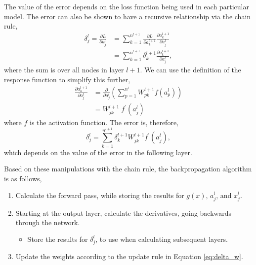 The value of the error depends on the loss function being used in each 
particular model. The error can also be shown to have a recursive relationship 
via the chain rule,
\begin{align*}
		\delta^l_j = \frac{\partial L}{\partial a^l_j} &= \sum_{k=1}^{n^{l+1}} 
		\frac{\partial L}{\partial a^{l+1}_{k}}\frac{\partial a^{l+1}_k}{\partial 
		a^l_j}\\ 
		&= \sum^{n^{l+1}}_{k = 1} \delta^{l+1}_k \frac{\partial a^{l+1}_k}{\partial 
		a^l_j},
\end{align*}
where the sum is over all nodes in layer $l+1$. We can use the definition of the
response function to simplify this further,
\begin{align*}
		\frac{\partial a^{l+1}_k}{\partial a^l_j} &= \frac{\partial}{\partial a^l_j} 
		\left( \sum^{n^l}_{p=1} W^{l+1}_{pk} f(a^l_p) \right) \\ 
		&= W^{l+1}_{jk} \; f^\prime(a^l_j)
\end{align*}
where $f$ is the activation function. The error is, therefore,
\begin{equation*}
	\delta^l_j = \sum^{n^{l+1}}_{k=1} \delta^{l+1}_k W^{l+1}_{jk} f^\prime(a^l_j),
\end{equation*}
which depends on the value of the error in the following layer.

Based on these manipulations with the chain rule, the backpropagation 
algorithm is as follows,
\begin{enumerate}
	\item Calculate the forward pass, while storing the results for $g(x)$, 
		$a^l_j$, and $x^l_j$.
	\item Starting at the output layer, calculate the derivatives, going backwards
		through the network. 
	\begin{itemize}
		\item Store the results for $\delta^l_j$, to use when calculating subsequent
			layers.
	\end{itemize}
	\item Update the weights according to the update rule in Equation 
		\ref{eq:delta_w}.
\end{enumerate}

